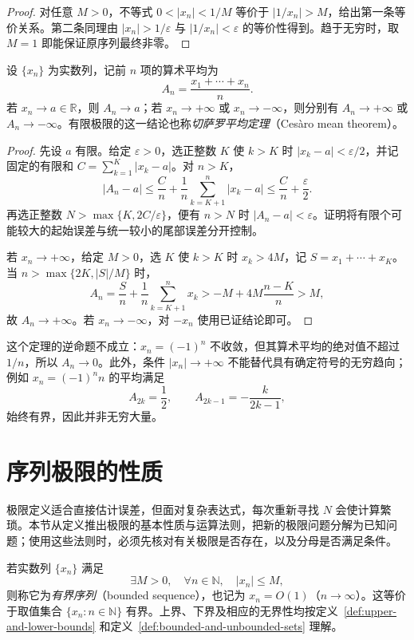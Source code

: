 \documentclass[UTF8,12pt,a4paper,fontset=fandol]{ctexbook}
\begin{document}
\begin{proof}
对任意 $M>0$，不等式 $0<|x_n|<1/M$ 等价于 $|1/x_n|>M$，给出第一条等价关系。第二条同理由 $|x_n|>1/\varepsilon$ 与 $|1/x_n|<\varepsilon$ 的等价性得到。趋于无穷时，取 $M=1$ 即能保证原序列最终非零。
\end{proof}

\begin{theorem}[算术平均保持极限]
\label{thm:cesaro-mean-of-convergent-sequence}
设 $\{x_n\}$ 为实数列，记前 $n$ 项的算术平均为
\[
    A_n=\frac{x_1+\cdots+x_n}{n}.
\]
若 $x_n\to a\in\mathbb{R}$，则 $A_n\to a$；若 $x_n\to+\infty$ 或 $x_n\to-\infty$，则分别有 $A_n\to+\infty$ 或 $A_n\to-\infty$。有限极限的这一结论也称\emph{切萨罗平均定理}（Cesàro mean theorem）。
\end{theorem}

\begin{proof}
先设 $a$ 有限。给定 $\varepsilon>0$，选正整数 $K$ 使 $k>K$ 时 $|x_k-a|<\varepsilon/2$，并记固定的有限和 $C=\sum_{k=1}^K|x_k-a|$。对 $n>K$，
\[
    |A_n-a|\leq\frac{C}{n}+\frac1n\sum_{k=K+1}^n|x_k-a|
    \leq\frac{C}{n}+\frac{\varepsilon}{2}.
\]
再选正整数 $N>\max\{K,2C/\varepsilon\}$，便有 $n>N$ 时 $|A_n-a|<\varepsilon$。证明将有限个可能较大的起始误差与统一较小的尾部误差分开控制。

若 $x_n\to+\infty$，给定 $M>0$，选 $K$ 使 $k>K$ 时 $x_k>4M$，记 $S=x_1+\cdots+x_K$。当 $n>\max\{2K,|S|/M\}$ 时，
\[
    A_n=\frac{S}{n}+\frac1n\sum_{k=K+1}^n x_k
    >-M+4M\frac{n-K}{n}>M,
\]
故 $A_n\to+\infty$。若 $x_n\to-\infty$，对 $-x_n$ 使用已证结论即可。
\end{proof}

这个定理的逆命题不成立：$x_n=(-1)^n$ 不收敛，但其算术平均的绝对值不超过 $1/n$，所以 $A_n\to0$。此外，条件 $|x_n|\to+\infty$ 不能替代具有确定符号的无穷趋向；例如 $x_n=(-1)^n n$ 的平均满足
\[
    A_{2k}=\frac12,\qquad A_{2k-1}=-\frac{k}{2k-1},
\]
始终有界，因此并非无穷大量。

\section{序列极限的性质}
\label{sec:properties-of-sequence-limits}

极限定义适合直接估计误差，但面对复杂表达式，每次重新寻找 $N$ 会使计算繁琐。本节从定义推出极限的基本性质与运算法则，把新的极限问题分解为已知问题；使用这些法则时，必须先核对有关极限是否存在，以及分母是否满足条件。

\begin{definition}
\label{def:bounded-sequence}
若实数列 $\{x_n\}$ 满足
\[
    \exists M>0,\quad\forall n\in\mathbb{N},\quad |x_n|\leq M,
\]
则称它为\emph{有界序列}（bounded sequence），也记为 $x_n=O(1)$（$n\to\infty$）。这等价于取值集合 $\{x_n:n\in\mathbb{N}\}$ 有界。上界、下界及相应的无界性均按定义~\ref{def:upper-and-lower-bounds} 和定义~\ref{def:bounded-and-unbounded-sets} 理解。
\end{definition}
\end{document}
